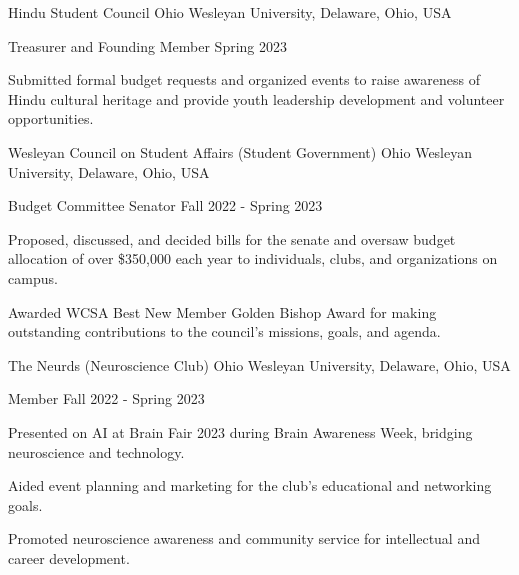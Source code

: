 \documentclass[10pt, letterpaper]{article}
\begin{document}
\begin{leadershipentry}
  {Hindu Student Council} %
  {Ohio Wesleyan University, Delaware, Ohio, USA} %
  \begin{positionentry}
    {Treasurer and Founding Member} %
    {Spring 2023} %
    \item Submitted formal budget requests and organized events to raise awareness of Hindu cultural heritage and provide youth leadership development and volunteer opportunities.
  \end{positionentry}
\end{leadershipentry}

\begin{leadershipentry}
  {Wesleyan Council on Student Affairs (Student Government)} %
  {Ohio Wesleyan University, Delaware, Ohio, USA} %
  \begin{positionentry}
    {Budget Committee Senator} %
    {Fall 2022 - Spring 2023} %
    \item Proposed, discussed, and decided bills for the senate and oversaw budget allocation of over \$350,000 each year to individuals, clubs, and organizations on campus.
    \item Awarded WCSA Best New Member Golden Bishop Award for making outstanding contributions to the council's missions, goals, and agenda.
  \end{positionentry}
\end{leadershipentry}

\begin{leadershipentry}
  {The Neurds (Neuroscience Club)} %
  {Ohio Wesleyan University, Delaware, Ohio, USA} %
  \begin{positionentry}
    {Member} %
    {Fall 2022 - Spring 2023} %
    \item Presented on AI at Brain Fair 2023 during Brain Awareness Week, bridging neuroscience and technology.
    \item Aided event planning and marketing for the club's educational and networking goals.
    \item Promoted neuroscience awareness and community service for intellectual and career development.
  \end{positionentry}
\end{leadershipentry}
\end{document}
